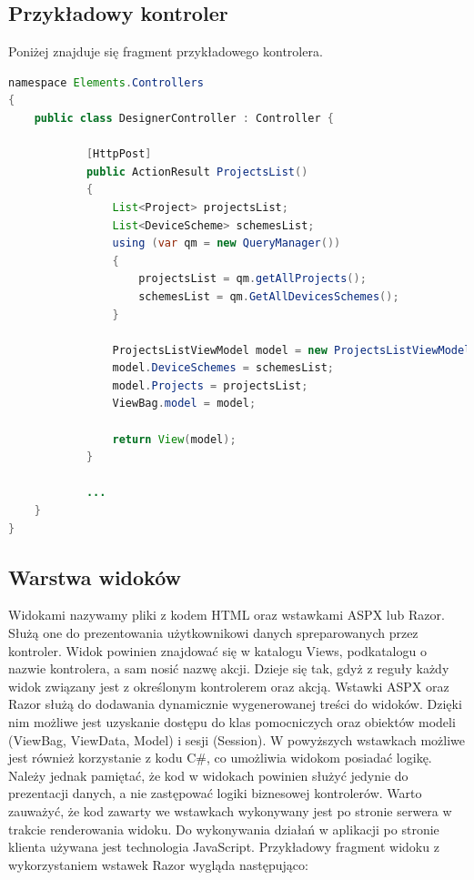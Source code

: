 \subsection{Przykładowy kontroler}
Poniżej znajduje się fragment przykładowego kontrolera.


\begin{lstlisting}[language=Java]
namespace Elements.Controllers
{
    public class DesignerController : Controller {
    
            [HttpPost]
            public ActionResult ProjectsList()
            {
                List<Project> projectsList;
                List<DeviceScheme> schemesList;
                using (var qm = new QueryManager())
                {
                    projectsList = qm.getAllProjects();
                    schemesList = qm.GetAllDevicesSchemes();
                }
                
                ProjectsListViewModel model = new ProjectsListViewModel();
                model.DeviceSchemes = schemesList;
                model.Projects = projectsList;
    			ViewBag.model = model;
    			
                return View(model);
            }
            
            ...     
    }
}
\end{lstlisting}


\subsection{Warstwa widoków}
Widokami nazywamy pliki z kodem HTML oraz wstawkami ASPX lub Razor. Służą one do prezentowania użytkownikowi danych spreparowanych przez kontroler. Widok powinien znajdować się w katalogu Views, podkatalogu o nazwie kontrolera, a sam nosić nazwę akcji. Dzieje się tak, gdyż z reguły każdy widok związany jest z określonym kontrolerem oraz akcją. 
Wstawki ASPX oraz Razor służą do dodawania dynamicznie wygenerowanej treści do widoków. Dzięki nim możliwe jest uzyskanie dostępu do klas pomocniczych oraz obiektów modeli (ViewBag, ViewData, Model) i sesji (Session). W powyższych wstawkach możliwe jest również korzystanie z kodu C\#, co umożliwia widokom posiadać logikę. Należy jednak pamiętać, że kod w widokach powinien służyć jedynie do prezentacji danych, a nie zastępować logiki biznesowej kontrolerów. Warto zauważyć, że kod zawarty we wstawkach wykonywany jest po stronie serwera w trakcie renderowania widoku. Do wykonywania działań w aplikacji po stronie klienta używana jest technologia JavaScript. Przykładowy fragment widoku z wykorzystaniem wstawek Razor wygląda następująco:


